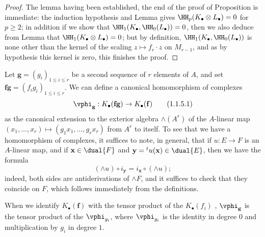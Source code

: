 \begin{proof}
The lemma having been established, the end of the proof of Proposition  is immediate: the induction hypothesis and Lemma  gives $\HH_p(K_\bullet\otimes L_\bullet)=0$ for $p\geq 2$; in addition if we show that $\HH_1(K_\bullet,\HH_0(L_\bullet))=0$, then we also deduce from Lemma  that $\HH_1(K_\bullet\otimes L_\bullet)=0$; but by definition, $\HH_1(K_\bullet,\HH_0(L_\bullet))$ is none other than the kernel of the scaling $z\mapsto f_r\cdot z$ on $M_{r-1}$, and as by hypothesis this kernel is zero, this finishes the proof.
\end{proof}

\begin{env}[1.1.5]
\label{III.1.1.5}
Let $\mathbf{g}=(g_i)_{1\leq i\leq r}$ be a second sequence of $r$ elements of $A$, and set $\mathbf{f}\mathbf{g}=(f_i g_i)_{1\leq i\leq r}$.
We can define a canonical homomorphism of complexes
\[
  \vphi_\mathbf{g}:K_\bullet(\mathbf{f}\mathbf{g})\to K_\bullet(\mathbf{f})
  \tag{1.1.5.1}
\]
as the canonical extension to the exterior algebra $\wedge(A^r)$ of the $A$-linear map $(x_1,\dots,x_r)\mapsto(g_1 x_1,\dots,g_r x_r)$ from $A^r$ to itself.
To see that we have a homomorphism of complexes, it suffices to note, in general, that if $u:E\to F$ is an $A$-linear map, and if $\mathbf{x}\in\dual{F}$ and $\mathbf{y}={}^t u(\mathbf{x})\in\dual{E}$, then we have the formula
\[
  (\wedge u)\circ i_\mathbf{y}=i_\mathbf{x}\circ(\wedge u);
  \tag{1.1.5.2}
\]
indeed, both sides are antiderivations of $\wedge F$, and it suffices to check that they coincide on $F$, which follows immediately from the definitions.

When we identify $K_\bullet(\mathbf{f})$ with the tensor product of the $K_\bullet(f_i)$ , $\vphi_\mathbf{g}$ is the tensor product of the $\vphi_{g_i}$, where $\vphi_{g_i}$ is the identity in degree $0$ and multiplication by $g_i$ in degree $1$.
\end{env}

